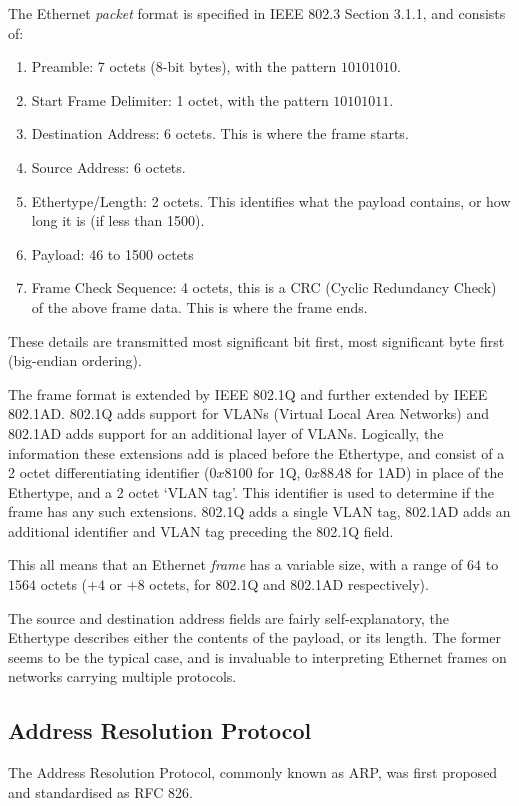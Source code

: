 \documentclass[10pt,a4paper,notitlepage]{report}
\begin{document}
The Ethernet \emph{packet} format is specified in IEEE 802.3 Section 3.1.1\cite{ieee802.3}, and consists of:
\begin{enumerate}
\item Preamble: 7 octets (8-bit bytes), with the pattern $10101010$.
\item Start Frame Delimiter: 1 octet, with the pattern $10101011$.
\item Destination Address: 6 octets. This is where the frame starts.
\item Source Address: 6 octets.
\item Ethertype/Length: 2 octets. This identifies what the payload contains, or how long it is (if less than 1500).
\item Payload: 46 to 1500 octets
\item Frame Check Sequence: 4 octets, this is a CRC (Cyclic Redundancy Check) of the above frame data. This is where the frame ends.
\end{enumerate}

These details are transmitted most significant bit first, most significant byte first (big-endian ordering).

The frame format is extended by IEEE 802.1Q and further extended by IEEE 802.1AD. 802.1Q adds support for VLANs (Virtual Local Area Networks) and 802.1AD adds support for an additional layer of VLANs.
Logically, the information these extensions add is placed before the Ethertype, and consist of a 2 octet differentiating identifier ($0x8100$ for 1Q, $0x88A8$ for 1AD) in place of the Ethertype, and a 2 octet `VLAN tag'. This identifier is used to determine if the frame has any such extensions. 802.1Q adds a single VLAN tag, 802.1AD adds an additional identifier and VLAN tag preceding the 802.1Q field.

This all means that an Ethernet \emph{frame} has a variable size, with a range of $64$ to $1564$ octets ($+4$ or $+8$ octets, for 802.1Q and 802.1AD respectively).

The source and destination address fields are fairly self-explanatory, the Ethertype describes either the contents of the payload, or its length. The former seems to be the typical case, and is invaluable to interpreting Ethernet frames on networks carrying multiple protocols.

\subsection{Address Resolution Protocol}
\label{sec:arp}
The Address Resolution Protocol, commonly known as ARP, was first proposed and standardised as RFC 826\cite{rfc826}.
\end{document}
